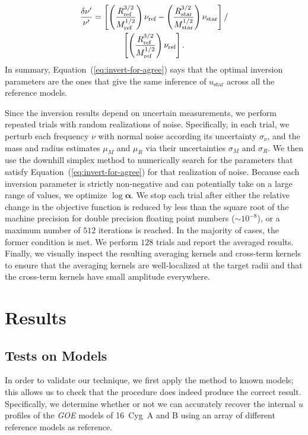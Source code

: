 \else
\begin{gather}
    \frac{\delta \nu'}{\nu'}
    =
    \left[
        \left(
            \frac{R_{\text{ref}}^{3/2}}{M_{\text{ref}}^{1/2}}
        \right) 
        \nu_{\text{ref}}
        -
        \left(
            \frac{R_{\text{star}}^{3/2}}{M_{\text{star}}^{1/2}}
        \right)
        \nu_{\text{star}}
    \right]
    / \notag \\
    \left[
        \left(
            \frac{R_{\text{ref}}^{3/2}}{M_{\text{ref}}^{1/2}}
        \right)
        \nu_{\text{ref}}
    \right]. 
\end{gather} 
\fi
In summary, Equation~(\ref{eq:invert-for-agree}) says that the optimal inversion parameters are the ones that give the same inference of $u_{\text{star}}$ across all the reference models. 


Since the inversion results depend on uncertain measurements, we perform repeated trials with random realizations of noise. 
Specifically, in each trial, we perturb each frequency $\nu$ with normal noise according its uncertainty $\sigma_{\nu}$, and the mass and radius estimates $\mu_M$ and $\mu_R$ via their uncertainties $\sigma_M$ and $\sigma_R$. 
We then use the %
downhill simplex method to numerically search for the parameters that satisfy Equation~(\ref{eq:invert-for-agree}) for that realization of noise. 
Because each inversion parameter is strictly non-negative and can potentially take on a large range of values, we optimize $\log \boldsymbol \alpha$. 
We stop each trial after either the relative change in the objective function is reduced by less than the square root of the machine precision for double precision floating point numbers (${\sim 10^{-8}}$), or a maximum number of $512$ iterations is reached. 
In the majority of cases, the former condition is met. 
We perform $128$ trials and report the averaged results. 
Finally, we visually inspect the resulting averaging kernels and cross-term kernels to ensure that the averaging kernels are well-localized at the target radii and that the cross-term kernels have small amplitude everywhere. 




{}
\section{Results} 
\subsection{Tests on Models} 
In order to validate our technique, we first apply the method to known models; this allows us to check that the procedure does indeed produce the correct result.
Specifically, we determine whether or not we can accurately recover the internal $u$ profiles of the \emph{GOE} models of 16~Cyg~A and B using an array of different reference models as reference.

